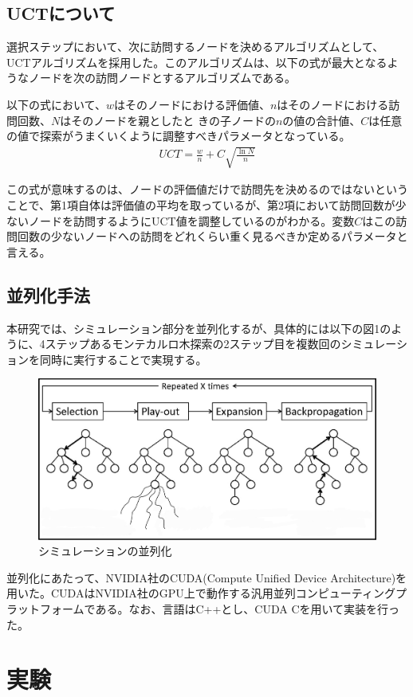 \documentclass[10pt, a4paper]{jsarticle}
\begin{document}
\subsection{UCTについて}
選択ステップにおいて、次に訪問するノードを決めるアルゴリズムとして、UCTアルゴリズムを採用した。このアルゴリズムは、以下の式が最大となるようなノードを次の訪問ノードとするアルゴリズムである。\par
以下の式において、$w$はそのノードにおける評価値、$n$はそのノードにおける訪問回数、$N$はそのノードを親としたと きの子ノードの$n$の値の合計値、$C$は任意の値で探索がうまくいくように調整すべきパラメータとなっている。
\begin{eqnarray}
    UCT = \frac{w}{n} + C\sqrt{\frac{\ln{N}}{n}}
\end{eqnarray}
\par
この式が意味するのは、ノードの評価値だけで訪問先を決めるのではないということで、第1項自体は評価値の平均を取っているが、第2項において訪問回数が少ないノードを訪問するようにUCT値を調整しているのがわかる。変数$C$はこの訪問回数の少ないノードへの訪問をどれくらい重く見るべきか定めるパラメータと言える。
\subsection{並列化手法}
本研究では、シミュレーション部分を並列化するが、具体的には以下の図1のように、4ステップあるモンテカルロ木探索の2ステップ目を複数回のシミュレーションを同時に実行することで実現する。
\begin{figure}[h]
    \includegraphics[width=15cm]{img/mcts_parallel.jpg}
    \caption{シミュレーションの並列化}
\end{figure}
\par
並列化にあたって、NVIDIA社のCUDA(Compute Unified Device Architecture)を用いた。CUDAはNVIDIA社のGPU上で動作する汎用並列コンピューティングプラットフォームである。なお、言語はC++とし、CUDA Cを用いて実装を行った。
\section{実験}
\end{document}

